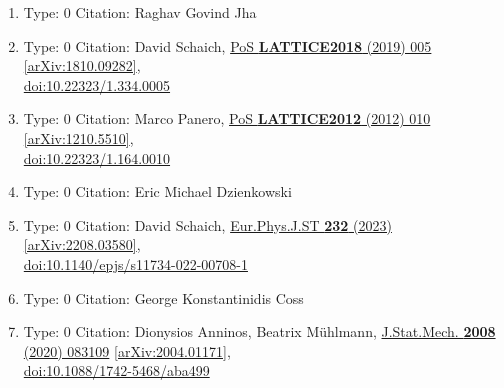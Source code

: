\documentclass[a4paper,10pt]{article}
\begin{document}
\begin{enumerate}
\begin{enumerate}
  \item Type: 0 Citation: Raghav Govind Jha
  \item Type: 0 Citation: David Schaich, \href{https://www.doi.org/10.22323/1.334.0005}{PoS {\bf LATTICE2018} (2019) 005}  \href{https://arxiv.org/abs/1810.09282}{[arXiv:1810.09282]},\\\href{https://www.doi.org/10.22323/1.334.0005}{doi:10.22323/1.334.0005}
  \item Type: 0 Citation: Marco Panero, \href{https://www.doi.org/10.22323/1.164.0010}{PoS {\bf LATTICE2012} (2012) 010}  \href{https://arxiv.org/abs/1210.5510}{[arXiv:1210.5510]},\\\href{https://www.doi.org/10.22323/1.164.0010}{doi:10.22323/1.164.0010}
  \item Type: 0 Citation: Eric Michael Dzienkowski
  \item Type: 0 Citation: David Schaich, \href{https://www.doi.org/10.1140/epjs/s11734-022-00708-1}{Eur.Phys.J.ST {\bf 232} (2023) }  \href{https://arxiv.org/abs/2208.03580}{[arXiv:2208.03580]},\\\href{https://www.doi.org/10.1140/epjs/s11734-022-00708-1}{doi:10.1140/epjs/s11734-022-00708-1}
  \item Type: 0 Citation: George Konstantinidis Coss
  \item Type: 0 Citation: Dionysios Anninos, Beatrix Mühlmann, \href{https://www.doi.org/10.1088/1742-5468/aba499}{J.Stat.Mech. {\bf 2008} (2020) 083109}  \href{https://arxiv.org/abs/2004.01171}{[arXiv:2004.01171]},\\\href{https://www.doi.org/10.1088/1742-5468/aba499}{doi:10.1088/1742-5468/aba499}

\end{enumerate}
\end{enumerate}
\end{document}
